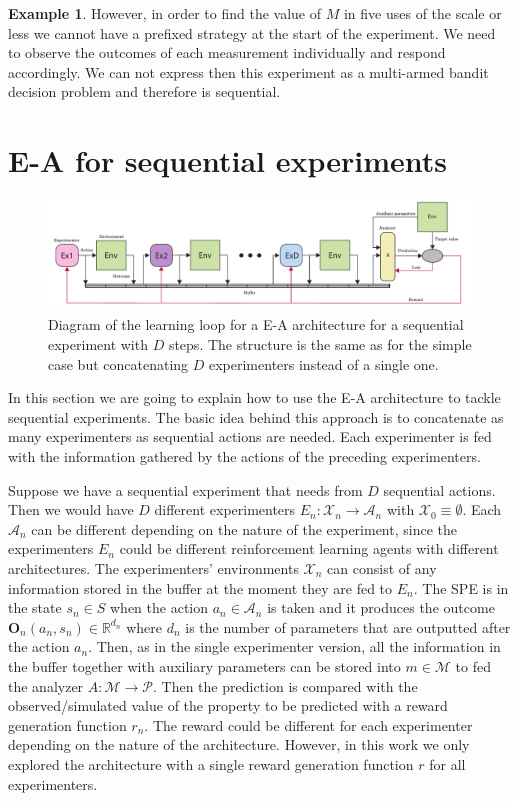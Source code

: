 \documentclass[11pt,a4paper,twoside]{report}
\newcommand{\+}{\textnormal{+} }
\theoremstyle{definition}
\newtheorem{myex}[mythm]{Example}
\numberwithin{equation}{chapter}
\begin{document}
\begin{myex}
However, in order to find the value of $M$ in five uses of the scale or less we
cannot have a prefixed strategy at the start of the experiment. We need to
observe the outcomes of each measurement individually and respond accordingly.
We can not express then this experiment as a multi-armed bandit decision
problem and therefore is sequential.

\end{myex}

\section{E-A for sequential experiments}

\begin{figure}[t]
  \includegraphics[width=\columnwidth]{figures/sequential-EA.pdf}
  \caption{Diagram of the learning loop for a E-A architecture for a 
  sequential experiment with $D$ steps. The structure is the same as for 
  the simple case but concatenating $D$ experimenters instead of a single one.}
  \label{fig:SequentialEA}
\end{figure}

In this section we are going to explain how to use the E-A architecture to
tackle sequential experiments. The basic idea behind this approach is to
concatenate as many experimenters as sequential actions are needed. Each
experimenter is fed with the information gathered by the actions of the
preceding experimenters. 

Suppose we have a sequential experiment that needs from $D$ sequential actions.
Then we would have $D$ different experimenters $E_n:\mathcal{X}_n\rightarrow
\mathcal{A}_n$ with $\mathcal{X}_0\equiv\emptyset$. Each $\mathcal{A}_n$ can be
different depending on the nature of the experiment, since the experimenters
$E_n$ could be different reinforcement learning agents with different
architectures. The experimenters' environments $\mathcal{X}_n$ can consist of
any information stored in the buffer at the moment they are fed to $E_n$. The
SPE is in the state $s_n \in S$ when the action $a_n \in \mathcal{A}_n$ is taken
and it produces the outcome $\textbf{O}_n(a_n, s_n) \in \mathbb{R}^{d_n}$ where
$d_n$ is the number of parameters that are outputted after the action $a_n$.
Then, as in the single experimenter version, all the information in the buffer
together with auxiliary parameters can be stored into $m\in\mathcal{M}$ to fed
the analyzer $A:\mathcal{M}\rightarrow \mathcal{P}$. Then the prediction is
compared with the observed/simulated value of the property to be predicted with
a reward generation function $r_n$. The reward could be different for each
experimenter depending on the nature of the architecture. However, in this work
we only explored the architecture with a single reward generation function $r$
for all experimenters.
\end{document}
